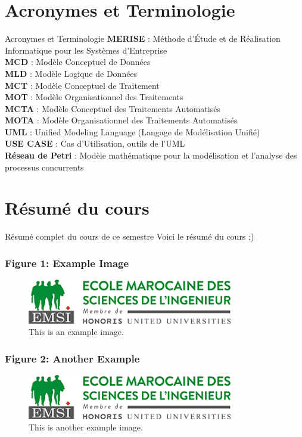 \documentclass{beamer}
\begin{document}
\section{Acronymes et Terminologie}
\begin{frame}{Acronymes et Terminologie}
    \textbf{MERISE} : Méthode d'Étude et de Réalisation Informatique pour les Systèmes d'Entreprise \\
    \textbf{MCD} : Modèle Conceptuel de Données \\
    \textbf{MLD} : Modèle Logique de Données \\
    \textbf{MCT} : Modèle Conceptuel de Traitement \\
    \textbf{MOT} : Modèle Organisationnel des Traitements \\
    \textbf{MCTA} : Modèle Conceptuel des Traitements Automatisés \\
    \textbf{MOTA} : Modèle Organisationnel des Traitements Automatisés \\
    \textbf{UML} : Unified Modeling Language (Langage de Modélisation Unifié) \\
    \textbf{USE CASE} : Cas d’Utilisation, outils de l'UML \\
    \textbf{Réseau de Petri} : Modèle mathématique pour la modélisation et l’analyse des processus concurrents \\
\end{frame}


\section{Résumé du cours}
\begin{frame}{Résumé complet du cours de ce semestre}
Voici le résumé du cours ;)
\end{frame}


\begin{frame}
    \frametitle{Figure 1: Example Image}
    \label{fig1}
    \begin{figure}
        \includegraphics[width=0.8\textwidth]{logo}
        \caption{This is an example image.}
    \end{figure}
\end{frame}

\begin{frame}
    \frametitle{Figure 2: Another Example}
    \label{fig2}
    \begin{figure}
        \includegraphics[width=0.8\textwidth]{logo}
        \caption{This is another example image.}
    \end{figure}
\end{frame}
\end{document}
